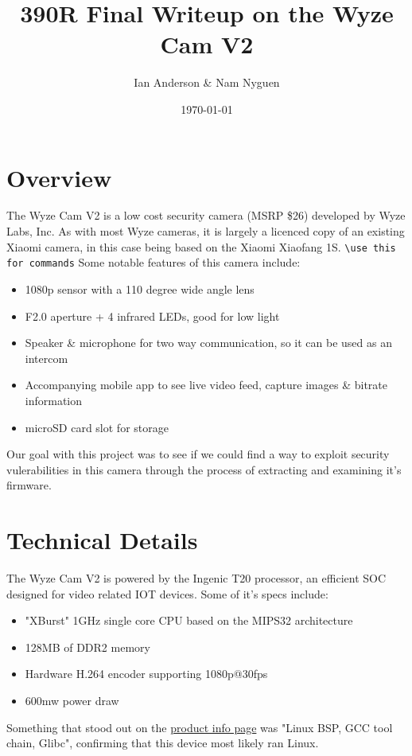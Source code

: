 \documentclass[a4paper, 11pt]{article}
\title{390R Final Writeup on the Wyze Cam V2}
\author{Ian Anderson \& Nam Nyguen}
\date{\today}
\begin{document}
\maketitle

\section{Overview}
The Wyze Cam V2 is a low cost security camera (MSRP \$26) developed by Wyze Labs, Inc. As with most Wyze cameras, it is largely a licenced copy of an existing Xiaomi camera, in this case being based on the Xiaomi Xiaofang 1S. \verb|\use this for commands|\newline\newline
Some notable features of this camera include:
\begin{itemize}
    \item 1080p sensor with a 110 degree wide angle lens
    \item F2.0 aperture + 4 infrared LEDs, good for low light
    \item Speaker \& microphone for two way communication, so it can be used as an intercom
    \item Accompanying mobile app to see live video feed, capture images \& bitrate information
    \item microSD card slot for storage 
  \end{itemize}
  Our goal with this project was to see if we could find a way to exploit security vulerabilities in this camera through the process of extracting and examining it's firmware.
\section{Technical Details}
The Wyze Cam V2 is powered by the Ingenic T20 processor, an efficient SOC designed for video related IOT devices. Some of it's specs include:
\begin{itemize}
  \item "XBurst" 1GHz single core CPU based on the MIPS32 architecture
  \item 128MB of DDR2 memory
  \item Hardware H.264 encoder supporting 1080p@30fps
  \item 600mw power draw
\end{itemize}
Something that stood out on the \href{https://www.indasina.com/ingenic-t20-fhd-smart-video-processor-best-choice-for-smart-video-application_p28.html}{product info page} was "Linux BSP, GCC tool chain, Glibc", confirming that this device most likely ran Linux.
\end{document}
